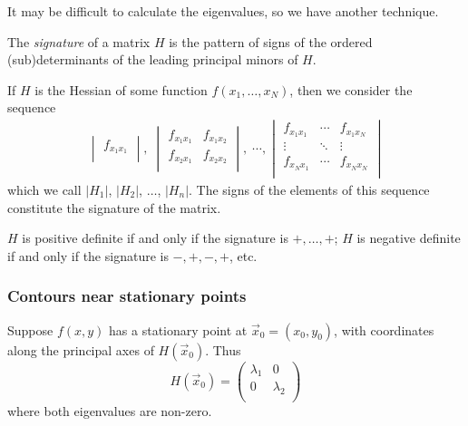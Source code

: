 \documentclass{../../template/note}
\begin{document}
    It may be difficult to calculate the eigenvalues, so we have another technique.

    \begin{definition}
        The \emph{signature} of a matrix \(H\) is the pattern of signs of the ordered (sub)determinants of the leading principal minors of \(H\).
    \end{definition}
    
    \begin{example}
        If \(H\) is the Hessian of some function \(f(x_1, \dots, x_N)\), then we consider the sequence
        \begin{align*}
            \begin{vmatrix}
             f_{x_1x_1} \\
            \end{vmatrix}, \; \begin{vmatrix}
             f_{x_1x_1} & f_{x_1x_2} \\
             f_{x_2x_1} & f_{x_2x_2} \\
            \end{vmatrix}, \; \cdots, \begin{vmatrix}
             f_{x_1x_1} & \cdots & f_{x_1x_N} \\
             \vdots & \ddots & \vdots \\
             f_{x_Nx_1} & \cdots & f_{x_Nx_N} \\
            \end{vmatrix}
        \end{align*}
        which we call \(|H_1|\), \(|H_2|\), \(\dots\), \(|H_n|\). The signs of the elements of this sequence constitute the signature of the matrix.        
    \end{example}
    
    \begin{theorem}
        \(H\) is positive definite if and only if the signature is \(+, \dots, +\); \(H\) is negative definite if and only if the signature is \(-, +, -, +\), etc.
    \end{theorem}
    
    \subsubsection{Contours near stationary points}

    Suppose \(f(x, y)\) has a stationary point at \(\vec x_0 = (x_0, y_0)\), with coordinates along the principal axes of \(H(\vec x_0)\). Thus
    \[
        H(\vec x_0) = \begin{pmatrix}
         \lambda_1 & 0 \\
         0 & \lambda_2 \\
        \end{pmatrix}
    \]
    where both eigenvalues are non-zero.
\end{document}
